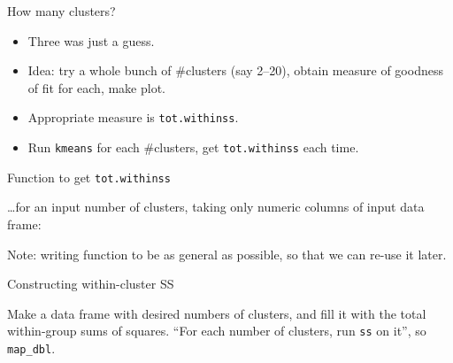 \documentclass[
  ignorenonframetext,
]{beamer}
\newenvironment{Shaded}{\begin{snugshade}}{\end{snugshade}}
\newcommand{\ControlFlowTok}[1]{\textcolor[rgb]{0.13,0.29,0.53}{\textbf{#1}}}
\newcommand{\DataTypeTok}[1]{\textcolor[rgb]{0.13,0.29,0.53}{#1}}
\newcommand{\DecValTok}[1]{\textcolor[rgb]{0.00,0.00,0.81}{#1}}
\newcommand{\KeywordTok}[1]{\textcolor[rgb]{0.13,0.29,0.53}{\textbf{#1}}}
\newcommand{\NormalTok}[1]{#1}
\newcommand{\OperatorTok}[1]{\textcolor[rgb]{0.81,0.36,0.00}{\textbf{#1}}}
\newcommand{\StringTok}[1]{\textcolor[rgb]{0.31,0.60,0.02}{#1}}
\begin{document}
\begin{frame}[fragile]{How many clusters?}
\protect\hypertarget{how-many-clusters}{}

\begin{itemize}
\item
  Three was just a guess.
\item
  Idea: try a whole bunch of \#clusters (say 2--20), obtain measure of
  goodness of fit for each, make plot.
\item
  Appropriate measure is \texttt{tot.withinss}.
\item
  Run \texttt{kmeans} for each \#clusters, get \texttt{tot.withinss}
  each time.
\end{itemize}

\end{frame}

\begin{frame}[fragile]{Function to get \texttt{tot.withinss}}
\protect\hypertarget{function-to-get-tot.withinss}{}

\ldots for an input number of clusters, taking only numeric columns of
input data frame:

\begin{Shaded}
\end{Shaded}

Note: writing function to be as general as possible, so that we can
re-use it later.

\end{frame}

\begin{frame}[fragile]{Constructing within-cluster SS}
\protect\hypertarget{constructing-within-cluster-ss}{}

Make a data frame with desired numbers of clusters, and fill it with the
total within-group sums of squares. ``For each number of clusters, run
\texttt{ss} on it'', so \texttt{map\_dbl}.

\normalsize

\begin{Shaded}
\end{Shaded}

\normalsize

\end{frame}
\end{document}
